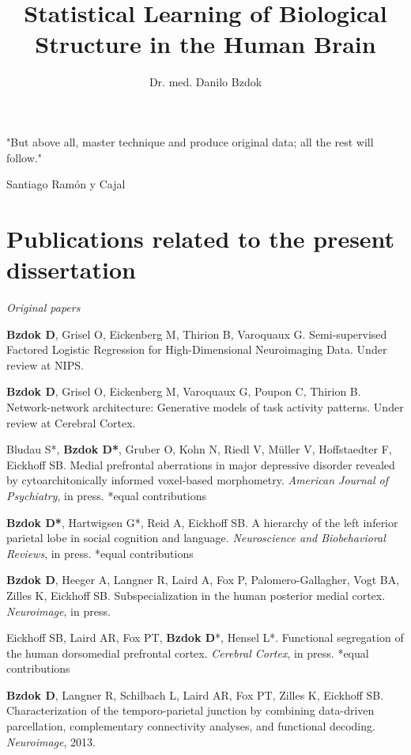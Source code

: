 \documentclass[authoryear,review,3p]{elsarticle}
\begin{document}
  
\begin{frontmatter}

\title{Statistical Learning of Biological Structure in the Human Brain}

\author{Dr. med. Danilo Bzdok}

\end{frontmatter}

\bigskip
\bigskip
\bigskip
\centerline{
"But above all, master technique and produce original data; 
all the rest will follow."}
\centerline{Santiago Ram\'{o}n y Cajal}

\bigskip

\newpage
\section*{Publications related to the present dissertation}
\linebreak
\textit{Original papers}

\textbf{Bzdok D}, Grisel O, Eickenberg M, Thirion B, Varoquaux G.
Semi-supervised Factored Logistic Regression for High-Dimensional
Neuroimaging Data. Under review at NIPS.

\textbf{Bzdok D}, Grisel O, Eickenberg M, Varoquaux G, Poupon C, Thirion B.
Network-network architecture: Generative models of task activity patterns.
Under review at Cerebral Cortex.

Bludau S*, \textbf{Bzdok D*}, Gruber O,
Kohn N, Riedl V, Müller V, Hoffstaedter F, Eickhoff SB.
Medial prefrontal aberrations in major depressive disorder
revealed by cytoarchitonically informed voxel-based morphometry.
\textit{American Journal of Psychiatry}, in press. *equal contributions

\textbf{Bzdok D*}, Hartwigsen G*, Reid A, Eickhoff SB.
A hierarchy of the left inferior parietal lobe in social cognition and
language.
\textit{Neuroscience and Biobehavioral Reviews}, in press. *equal contributions

\textbf{Bzdok D}, Heeger A, Langner R, Laird A, Fox P, Palomero-Gallagher,
Vogt BA, Zilles K, Eickhoff SB.
Subspecialization in the human posterior medial cortex.
\textit{Neuroimage}, in press.

Eickhoff SB, Laird AR, Fox PT, \textbf{Bzdok D}*, Hensel L*.
Functional segregation of the human dorsomedial prefrontal cortex.
\textit{Cerebral Cortex}, in press. *equal contributions

\textbf{Bzdok D}, Langner R, Schilbach L, Laird AR, Fox PT, Zilles K, Eickhoff SB.
Characterization of the temporo-parietal junction by combining data-driven
parcellation, complementary connectivity analyses, and functional decoding.
\textit{Neuroimage}, 2013.
\end{document}
